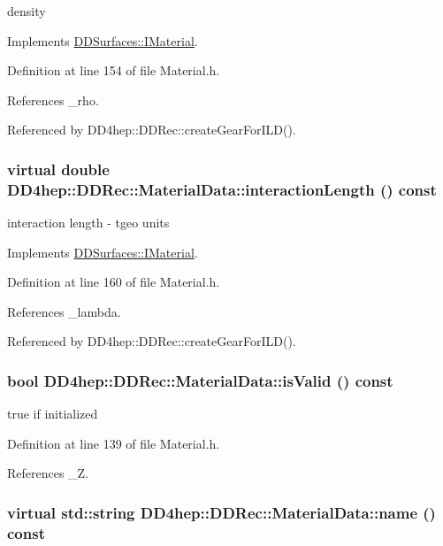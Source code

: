 density 

Implements \hyperlink{class_d_d_surfaces_1_1_i_material_ac856b9cd5ade3e0ee2720c95af766d25}{DDSurfaces::IMaterial}.

Definition at line 154 of file Material.h.

References \_\-rho.

Referenced by DD4hep::DDRec::createGearForILD().\hypertarget{class_d_d4hep_1_1_d_d_rec_1_1_material_data_a0e3fd6b074f9ded683b5e2e66569cd0c}{
\subsubsection[{interactionLength}]{\setlength{\rightskip}{0pt plus 5cm}virtual double DD4hep::DDRec::MaterialData::interactionLength () const}}
\label{class_d_d4hep_1_1_d_d_rec_1_1_material_data_a0e3fd6b074f9ded683b5e2e66569cd0c}


interaction length -\/ tgeo units 

Implements \hyperlink{class_d_d_surfaces_1_1_i_material_a9217c1bc6b4c5562893c4249967cf64d}{DDSurfaces::IMaterial}.

Definition at line 160 of file Material.h.

References \_\-lambda.

Referenced by DD4hep::DDRec::createGearForILD().\hypertarget{class_d_d4hep_1_1_d_d_rec_1_1_material_data_a27c7d3f8451ecdfc4bb906eba53a0c8a}{
\subsubsection[{isValid}]{\setlength{\rightskip}{0pt plus 5cm}bool DD4hep::DDRec::MaterialData::isValid () const}}
\label{class_d_d4hep_1_1_d_d_rec_1_1_material_data_a27c7d3f8451ecdfc4bb906eba53a0c8a}


true if initialized 

Definition at line 139 of file Material.h.

References \_\-Z.\hypertarget{class_d_d4hep_1_1_d_d_rec_1_1_material_data_ac9e726288ae5d247dd007264a6ab906c}{
\subsubsection[{name}]{\setlength{\rightskip}{0pt plus 5cm}virtual std::string DD4hep::DDRec::MaterialData::name () const}}
\label{class_d_d4hep_1_1_d_d_rec_1_1_material_data_ac9e726288ae5d247dd007264a6ab906c}


